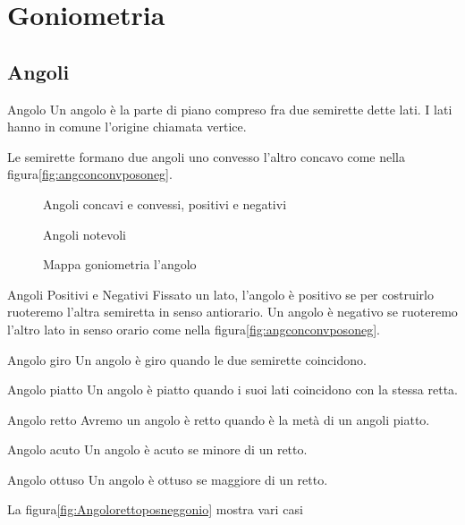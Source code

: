 \chapter{Goniometria}
\label{sec:GONIOMETRIA}
\section{Angoli}
\label{sec:gonioang}
\begin{definizionet}{Angolo}{}
Un angolo è la parte di piano compreso fra due semirette dette lati. I lati hanno in comune l'origine chiamata vertice.
\end{definizionet}

Le  semirette formano due angoli  uno convesso l'altro concavo come nella figura\nobs\vref{fig:angconconvposoneg}. 
\begin{figure} %
	\centering

	\caption{Angoli concavi e convessi, positivi e negativi}\label{fig:angconconvposoneg}
\end{figure}
\begin{figure} %
	\centering

	\caption{Angoli notevoli}\label{fig:Angolorettoposneggonio}
\end{figure}
\begin{figure}

%
	\caption{Mappa goniometria l'angolo}\label{fig:MappaGonometria1}
\end{figure}
\begin{definizionet}{Angoli Positivi e Negativi}{}
	Fissato un lato, l'angolo è  positivo  se per costruirlo ruoteremo l'altra semiretta in senso antiorario.  Un angolo è negativo se ruoteremo l'altro lato in senso orario come nella figura\nobs\vref{fig:angconconvposoneg}. 
\end{definizionet}
\begin{definizionet}{Angolo giro}{}
Un angolo è giro quando le due semirette coincidono. 
\end{definizionet}
\begin{definizionet}{Angolo piatto}{}
Un angolo è  piatto quando i suoi lati  coincidono con la stessa retta.
\end{definizionet}
\begin{definizionet}{Angolo retto}{}
Avremo un angolo è retto quando è la metà di un angoli piatto. 
\end{definizionet}
\begin{definizionet}{Angolo acuto}{}
Un angolo è acuto se  minore di un  retto.
\end{definizionet}
\begin{definizionet}{Angolo ottuso}{}
Un angolo è ottuso se  maggiore di un  retto.
\end{definizionet}
 La figura\nobs\vref{fig:Angolorettoposneggonio} mostra  vari casi
